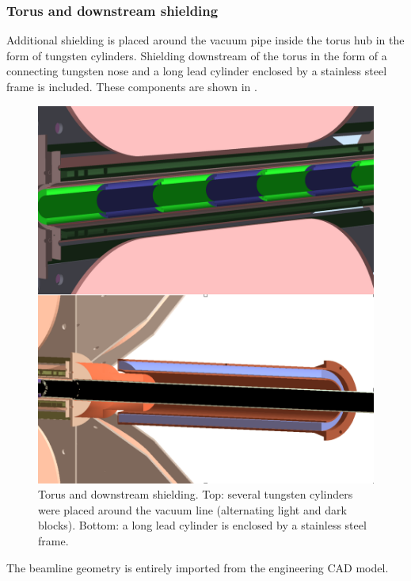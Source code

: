 \subsubsection{Torus and downstream shielding}
Additional shielding is placed around the vacuum pipe inside the torus hub in the form of tungsten cylinders.
Shielding downstream of the torus in the form of a connecting tungsten nose and a long lead cylinder enclosed
by a stainless steel frame is included. These components are shown in .

\begin{figure}
	\centering
	\includegraphics[width=0.98\columnwidth,keepaspectratio]{img/downstreamShielding.png}
	\caption{Torus and downstream shielding. Top: several tungsten cylinders were placed around the vacuum line
			 (alternating light and dark blocks).
             Bottom: a long lead cylinder is enclosed by a stainless steel frame.}
	\label{fig:downstreamShielding}
\end{figure}


The beamline geometry is entirely imported from the engineering CAD model.
